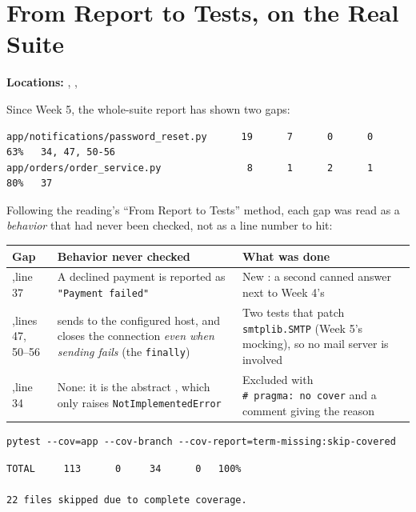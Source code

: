 \documentclass[11pt]{article}
\begin{document}
\section{From Report to Tests, on the Real Suite}
\textbf{Locations:} ,
,

Since Week 5, the whole-suite report has shown two gaps:
\begin{lstlisting}[style=shellstyle]
app/notifications/password_reset.py      19      7      0      0    63%   34, 47, 50-56
app/orders/order_service.py               8      1      2      1    80%   37
\end{lstlisting}
Following the reading's ``From Report to Tests'' method, each gap was
read as a \emph{behavior} that had never been checked, not as a line
number to hit:

\begin{center}
\small
\begin{tabular}{@{}L{3.7cm}L{5.0cm}L{5.7cm}@{}}
\toprule
\textbf{Gap} & \textbf{Behavior never checked} & \textbf{What was done} \\
\midrule
{},\newline line 37 & A declined payment is reported as
\texttt{"Payment failed"} & New : a second
canned answer next to Week 4's  \\
,\newline lines 47, 50--56 &  sends to
the configured host, and closes the connection \emph{even when sending
fails} (the \texttt{finally}) & Two tests that patch
\texttt{smtplib.SMTP} (Week 5's mocking), so no mail server is
involved \\
,\newline line 34 & None: it is the abstract
, which only raises
\texttt{NotImplementedError} & Excluded with
\texttt{\#~pragma:\ no~cover} and a comment giving the reason \\
\bottomrule
\end{tabular}
\end{center}

\begin{lstlisting}[style=shellstyle]
pytest --cov=app --cov-branch --cov-report=term-missing:skip-covered
\end{lstlisting}
\begin{lstlisting}[style=shellstyle,language={}]
TOTAL     113      0     34      0   100%

22 files skipped due to complete coverage.
\end{lstlisting}
\end{document}
